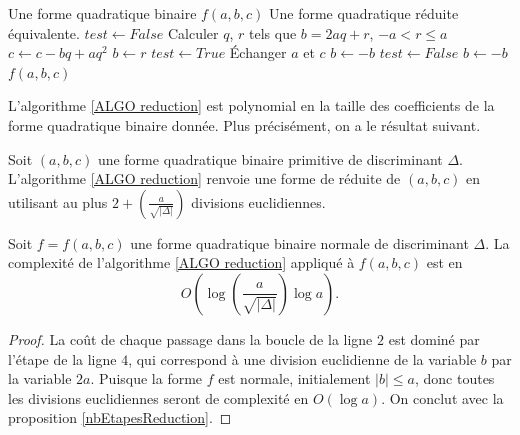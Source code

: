 \begin{algorithm}[h]
	\caption{Réduction de formes quadratiques binaires}
	\label{ALGO reduction}
	\begin{algorithmic}[1]
		\Require Une forme quadratique binaire $f(a,b,c)$
		\Ensure Une forme quadratique réduite équivalente.
		\State $test \gets False$
		\State Calculer $q$, $r$ tels que $b = 2aq + r$, $-a<r\leq a$
		\State $c \gets c - bq + aq^2$
		\State $b \gets r$
		\EndIf
		\State $test \gets True$
		\State Échanger $a$ et $c$
		\State $b \gets -b$
		\State $test \gets False$
		\EndIf
		\State $b \gets -b$
		\EndIf
		\EndIf
		\EndWhile
		\State \Return $f(a,b,c)$
	\end{algorithmic}
\end{algorithm}


L'algorithme \ref{ALGO reduction} est polynomial en la taille des coefficients de la forme quadratique binaire donnée. Plus précisément, on a le résultat suivant. 

\begin{Prop}\label{nbEtapesReduction}
	
	Soit $(a,b,c)$ une forme quadratique binaire primitive de discriminant $\Delta$. L'algorithme \ref{ALGO reduction} renvoie une forme de réduite de $(a,b,c)$ en utilisant au plus $2 + \left( \frac{a}{\sqrt{|\Delta|}} \right)$ divisions euclidiennes.
\end{Prop}

\begin{Coro}\label{COMPLEX reduction}
	Soit $f = f(a,b,c)$ une forme quadratique binaire normale de discriminant $\Delta$. La complexité de l'algorithme \ref{ALGO reduction} appliqué à $f(a,b,c)$ est en 
	\begin{equation*}
		O\left( \log\left( \frac{a}{\sqrt{|\Delta|}} \right)\log a \right).
	\end{equation*}
	
\end{Coro}

\begin{proof}
	La coût de chaque passage dans la boucle de la ligne $2$ est dominé par l'étape de la ligne $4$, qui correspond à une division euclidienne de la variable $b$ par la variable $2a$. Puisque la forme $f$ est normale, initialement $|b| \leq a$, donc toutes les divisions euclidiennes seront de complexité en $O(\log a)$. On conclut avec la proposition \ref{nbEtapesReduction}.
\end{proof}


